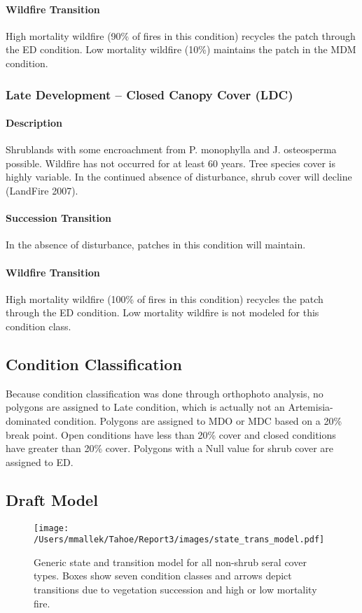 \paragraph{Wildfire Transition} High mortality wildfire (90\% of fires in this condition) recycles the patch through the ED condition. Low mortality wildfire (10\%) maintains the patch in the MDM condition.

\hrulefill


\subsubsection{Late Development – Closed Canopy Cover (LDC)}

\paragraph{Description} Shrublands with some encroachment from P. monophylla and J. osteosperma possible. Wildfire has not occurred for at least 60 years. Tree species cover is highly variable. In the continued absence of disturbance, shrub cover will decline (LandFire 2007).

\paragraph{Succession Transition} In the absence of disturbance, patches in this condition will maintain. 

\paragraph{Wildfire Transition} High mortality wildfire (100\% of fires in this condition) recycles the patch through the ED condition. Low mortality wildfire is not modeled for this condition class.

\hrulefill

\subsection{Condition Classification}
Because condition classification was done through orthophoto analysis, no polygons are assigned to Late condition, which is actually not an Artemisia-dominated condition. Polygons are assigned to MDO or MDC based on a 20\% break point. Open conditions have less than 20\% cover and closed conditions have greater than 20\% cover. Polygons with a Null value for shrub cover are assigned to ED.

\subsection{Draft Model}
\begin{figure}[htbp]
\centering
\texttt{[image: /Users/mmallek/Tahoe/Report3/images/state\_trans\_model.pdf]}
\caption{Generic state and transition model for all non-shrub seral cover types. Boxes show seven condition classes and arrows depict transitions due to vegetation succession and high or low mortality fire.} 
\label{sage_transmodel}
\end{figure}


